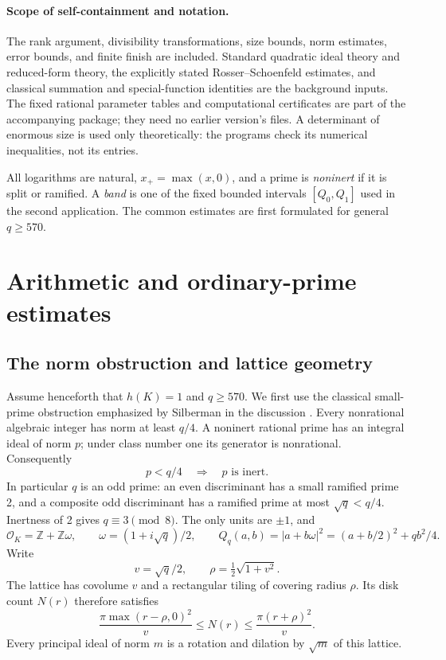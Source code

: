 \documentclass[11pt]{article}
\newcommand{\Z}{\mathbb Z}
\newcommand{\OK}{\mathcal O_K}
\begin{document}
\paragraph{Scope of self-containment and notation.}
The rank argument, divisibility transformations, size bounds, norm
estimates, error bounds, and finite finish are included. Standard
quadratic ideal theory and reduced-form theory, the explicitly stated
Rosser--Schoenfeld estimates, and classical summation and special-function
identities are the background inputs. The fixed rational parameter
tables and computational certificates are part of the accompanying
package; they need no earlier version's files. A determinant of enormous
size is used only theoretically: the programs check its numerical
inequalities, not its entries.

All logarithms are natural, \(x_+=\max(x,0)\), and a prime is
\emph{noninert} if it is split or ramified. A \emph{band} is one of
the fixed bounded intervals \([Q_0,Q_1]\) used in the second application.
The common estimates are first formulated for general \(q\ge570\).

\section{Arithmetic and ordinary-prime estimates}\label{background}
\subsection{The norm obstruction and lattice geometry}
Assume henceforth that \(h(K)=1\) and \(q\ge570\).
We first use the classical small-prime obstruction emphasized by
Silberman in the discussion \cite{silberman}.
Every nonrational algebraic integer has norm at least \(q/4\).
A noninert rational prime has an integral ideal of norm \(p\);
under class number one its generator is nonrational. Consequently
\begin{equation}\label{small-inert}
 p<q/4\quad\Longrightarrow\quad p\text{ is inert}.
\end{equation}
In particular \(q\) is an odd prime: an even discriminant has a small
ramified prime 2, and a composite odd discriminant has a ramified prime
at most \(\sqrt q<q/4\). Inertness of 2 gives \(q\equiv3\pmod8\).
The only units are \(\pm1\), and
\[
 \OK=\Z+\Z\omega,\qquad \omega=(1+i\sqrt q)/2,\qquad
 Q_q(a,b)=|a+b\omega|^2=(a+b/2)^2+qb^2/4.
\]
Write
\[
 v=\sqrt q/2,\qquad \rho=\tfrac12\sqrt{1+v^2}.
\]
The lattice has covolume \(v\) and a rectangular tiling of covering
radius \(\rho\). Its disk count \(N(r)\) therefore satisfies
\begin{equation}\label{disk}
 \frac{\pi\max(r-\rho,0)^2}{v}\le N(r)
 \le\frac{\pi(r+\rho)^2}{v}.
\end{equation}
Every principal ideal of norm \(m\) is a rotation and dilation by
\(\sqrt m\) of this lattice.
\end{document}
